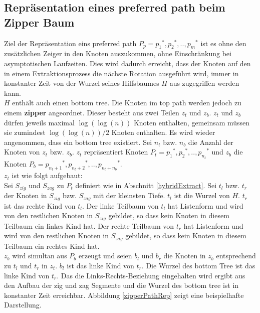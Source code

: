 \documentclass[a4paper,12pt]{article}
\begin{document}
\subsection{Repräsentation eines preferred path beim Zipper Baum}
Ziel der Repräsentation eins preferred path $P_p = {p_1}^*,{p_2}^*,..,{p_m}^*$ ist es ohne den zusätzlichen Zeiger in den Knoten auszukommen, ohne Einschränkung bei asymptotischen Laufzeiten. Dies wird dadurch erreicht, dass der Knoten auf den in einem Extraktionsprozess die nächste Rotation ausgeführt wird, immer in konstanter Zeit von der Wurzel seines Hilfsbaumes $H$ aus zugegriffen werden kann.\\
$H$ enthält auch einen bottom tree. Die Knoten im top path werden jedoch zu einem \textbf{zipper} angeordnet. Dieser besteht aus zwei Teilen $z_t$ und $z_b$. $z_t$ und $z_b$ dürfen jeweils maximal $\log\left(\log\left(n\right)\right)$ Knoten enthalten, gemeinsam müssen sie zumindest $\log\left(\log\left(n\right)\right) / 2$ Knoten enthalten. Es wird wieder angenommen, dass ein bottom tree existiert. Sei $n_t$ bzw. $n_b$ die Anzahl der Knoten von $z_t$ bzw. $z_b$. $z_t$ repräsentiert Knoten  $P_t = {p_1}^*,{p_2}^*,..,{p_{n_t}}^*$ und $z_b$ die Knoten  $P_b = {p_{n_t + 1}}^*,{p_{n_t + 2}}^*,..,{p_{n_t + n_b}}^*$. \\
$z_t$ ist wie folgt aufgebaut:\\
Sei $S_{zig}$ und $S_{zag}$ zu $P_t$ definiert wie in Abschnitt \ref{hybridExtract}.
Sei $t_l$ bzw. $t_r$ der Knoten in $S_{zig}$ bzw. $S_{zag}$ mit der kleinsten Tiefe. $t_l$ ist die Wurzel von $H$. $t_r$ ist das rechte Kind von $t_l$. Der linke Teilbaum von $t_l$  hat Listenform und  wird von den restlichen Knoten in $S_{zig}$ gebildet, so dass kein Knoten in diesem Teilbaum ein linkes Kind hat. Der rechte Teilbaum von $t_r$  hat Listenform und  wird von den restlichen Knoten in $S_{zag}$ gebildet, so dass kein Knoten in diesem Teilbaum ein rechtes Kind hat. \\
$z_b$ wird simultan aus $P_b$ erzeugt und seien $b_l$ und $b_r$ die Knoten in $z_b$ entsprechend zu $t_l$ und $t_r$ in $z_t$. $b_l$ ist das linke Kind von $t_r$. Die Wurzel des bottom Tree ist das linke Kind von $t_r$. Das die Links-Rechts-Beziehung eingehalten wird ergibt aus den Aufbau der zig und zag Segmente und die Wurzel des bottom tree ist in konstanter Zeit erreichbar. Abbildung \ref{zipperPathRep} zeigt eine beispielhafte Darstellung. 
\end{document}

